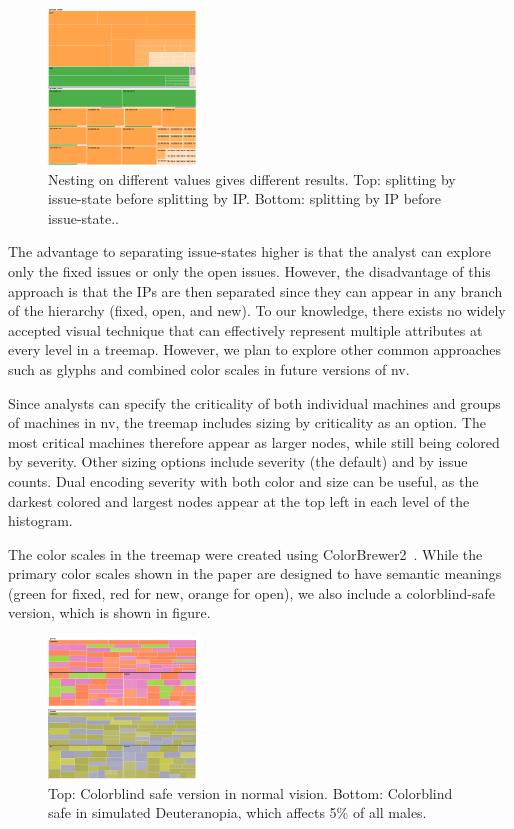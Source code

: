 \documentclass{acm_proc_article-sp}
\begin{document}
\begin{figure}
  \centering
  \includegraphics[width=0.35\textwidth]{../screenshots/state_issue}
  \caption{Nesting on different values gives different results. Top: splitting by issue-state before splitting by IP. Bottom: splitting by IP before issue-state..}
\end{figure}

The advantage to separating issue-states higher is that the analyst can explore only the fixed issues or only the open issues.
However, the disadvantage of this approach is that the IPs are then separated since they can appear in any branch of the hierarchy (fixed, open, and new).
To our knowledge, there exists no widely accepted visual technique that can effectively represent multiple attributes at every level in a treemap.
However, we plan to explore other common approaches such as glyphs and combined color scales in future versions of nv.


Since analysts can specify the criticality of both individual machines and groups of machines in nv, the treemap includes sizing by criticality as an option.
The most critical machines therefore appear as larger nodes, while still being colored by severity.
Other sizing options include severity (the default) and by issue counts.
Dual encoding severity with both color and size can be useful, as the darkest colored and largest nodes appear at the top left in each level of the histogram.

The color scales in the treemap were created using ColorBrewer2~\cite{colorbrewer2}.
While the primary color scales shown in the paper are designed to have semantic meanings (green for fixed, red for new, orange for open), we also include a colorblind-safe version, which is shown in figure.


\begin{figure}
  \centering
  \includegraphics[width=0.35\textwidth]{../screenshots/cb_version_both}
  \caption{Top: Colorblind safe version in normal vision. Bottom: Colorblind safe in simulated Deuteranopia, which affects 5\% of all males.}
\end{figure}
\end{document}
